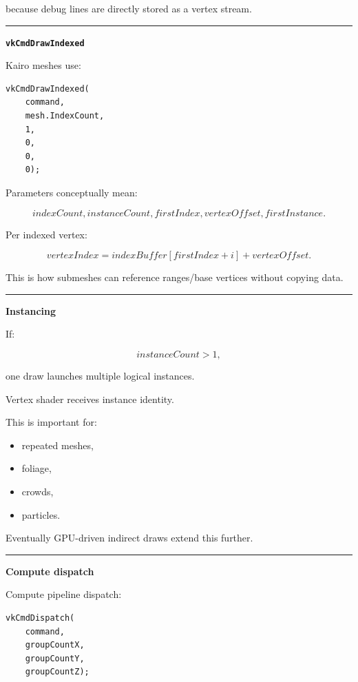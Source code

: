 because debug lines are directly stored as a vertex stream.

\begin{center}\rule{0.5\linewidth}{0.5pt}\end{center}

\textbf{\texttt{vkCmdDrawIndexed}}

Kairo meshes use:

\begin{verbatim}
vkCmdDrawIndexed(
    command,
    mesh.IndexCount,
    1,
    0,
    0,
    0);
\end{verbatim}

Parameters conceptually mean:

\[
indexCount,
instanceCount,
firstIndex,
vertexOffset,
firstInstance.
\]

Per indexed vertex:

\[
vertexIndex
=
indexBuffer[firstIndex+i]
+
vertexOffset.
\]

This is how submeshes can reference ranges/base vertices without copying data.

\begin{center}\rule{0.5\linewidth}{0.5pt}\end{center}

\textbf{Instancing}

If:

\[
instanceCount>1,
\]

one draw launches multiple logical instances.

Vertex shader receives instance identity.

This is important for:

\begin{itemize}
\tightlist
\item
  repeated meshes,
\item
  foliage,
\item
  crowds,
\item
  particles.
\end{itemize}

Eventually GPU-driven indirect draws extend this further.

\begin{center}\rule{0.5\linewidth}{0.5pt}\end{center}

\textbf{Compute dispatch}

Compute pipeline dispatch:

\begin{verbatim}
vkCmdDispatch(
    command,
    groupCountX,
    groupCountY,
    groupCountZ);
\end{verbatim}

